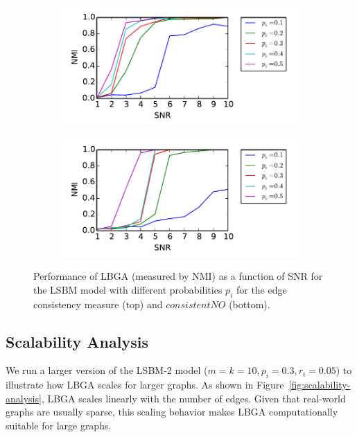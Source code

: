 \documentclass{article}
\begin{document}
\begin{figure}[bht]

\begin{subfigure}{0.01\columnwidth}
     \includegraphics[scale=0.7]{figures/signal-to-noise-ECC.pdf}
\end{subfigure}    

\begin{subfigure}{0.01\columnwidth}
    \includegraphics[scale=0.7]{figures/signal-to-noise-consistentNO.pdf}
\end{subfigure}

\caption{Performance of LBGA (measured by NMI) as a function of SNR for the
LSBM model with different probabilities $p_i$ for the edge consistency measure
(top) and $consistentNO$ (bottom).} 
\label{fig:sensitivity-analysis}
\end{figure}

\subsection{Scalability Analysis}
\label{sec:scalability-analysis}

We run a larger version of the LSBM-2 model ($m=k=10,p_i=0.3,r_i=0.05$) to
illustrate how LBGA scales for larger graphs. As shown in
Figure~\ref{fig:scalability-analysis}, LBGA scales linearly with the number of
edges. Given that real-world graphs are usually sparse, this scaling behavior
makes LBGA computationally suitable for large graphs.
\end{document}
